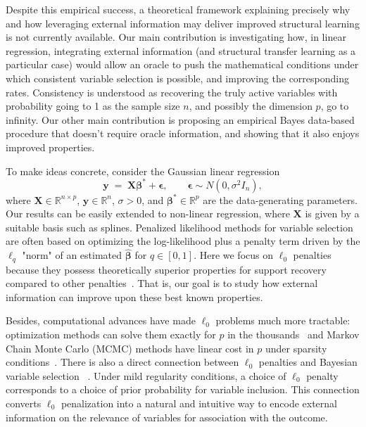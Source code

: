 \documentclass[
  12pt]{article}
\newcommand{\R}{\mathbb{R}}
\newcommand{\by}{\mathbf{y}}
\newcommand{\bbeta}{\boldsymbol{\beta}}
\newcommand{\bepsilon}{\mathbf{\epsilon}}
\newcommand{\bX}{\mathbf{X}}
\begin{document}
Despite this empirical success, a theoretical framework explaining precisely why and how leveraging external information may deliver improved structural learning is not currently available. 
Our main contribution is investigating how, in linear regression, integrating external information (and structural transfer learning as a particular case) would allow an oracle to push the mathematical conditions under which consistent variable selection is possible, and improving the corresponding rates. Consistency is understood as recovering the truly active variables with probability going to 1 as the sample size $n$, and possibly the dimension $p$, go to infinity. 
Our other main contribution is proposing an empirical Bayes data-based procedure that doesn't require oracle information, and showing that it also enjoys improved properties.

To make ideas concrete, consider the Gaussian linear regression
\begin{equation}\label{eq:linearmodel}
	\by \;=\; \bX \bbeta^* + \bepsilon,\qquad \bepsilon \sim N(0,\sigma^2 I_n),
\end{equation}
where $\bX\in \R^{n\times p}$, $\by\in \R^n$, $\sigma >0$, and $\bbeta^* \in \mathbb{R}^p$ are the data-generating parameters. Our results can be easily  extended to non-linear regression, where $\bX$ is given by a suitable basis such as splines. 
Penalized likelihood methods for variable selection are often based on optimizing the log-likelihood plus a penalty term driven by the $\ell_q$ "norm" of an estimated $\hat{\bbeta}$ for $q\in [0,1]$. 
Here we focus on $\ell_0$ penalties because they possess theoretically superior properties for support recovery compared to other penalties~\citep{infotheowainwright, gao2025optimalityl0}. That is, our goal is to study how external information can improve upon these best known properties. 

Besides, computational advances have made $\ell_0$ problems much more tractable: optimization methods can solve them exactly for $p$ in the thousands~\citep{bertsimas2020sparse} and Markov Chain Monte Carlo (MCMC) methods have linear cost in $p$ under sparsity conditions~\citep{Yang2016,zhou2022}. There is also a direct connection between $\ell_0$ penalties and Bayesian variable selection ~\citep{BIC,EBIC,rossell2022concentration}. Under mild regularity conditions, a choice of $\ell_0$ penalty corresponds to a choice of prior probability for variable inclusion. This connection converts $\ell_0$ penalization into a natural and intuitive way to encode external information on the relevance of variables for association with the outcome. 
\end{document}
